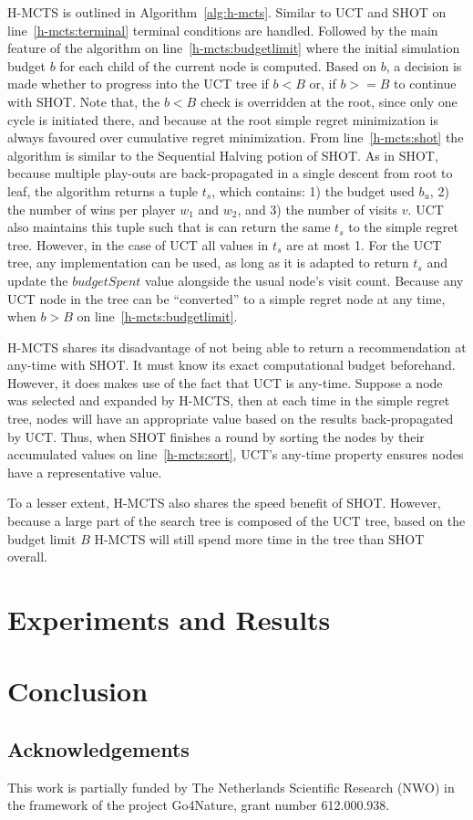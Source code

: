 \documentclass[a4paper]{llncs}
\begin{document}
H-MCTS is outlined in Algorithm~\ref{alg:h-mcts}. Similar to UCT and SHOT on line~\ref{h-mcts:terminal} terminal conditions are handled. Followed by the main feature of the algorithm on line~\ref{h-mcts:budgetlimit} where the initial simulation budget $b$ for each child of the current node is computed. Based on $b$, a decision is made whether to progress into the UCT tree if $b<B$ or, if $b >= B$ to continue with SHOT. Note that, the $b<B$ check is overridden at the root, since only one cycle is initiated there, and because at the root simple regret minimization is always favoured over cumulative regret minimization. From line~\ref{h-mcts:shot} the algorithm is similar to the Sequential Halving potion of SHOT. As in SHOT, because multiple play-outs are back-propagated in a single descent from root to leaf, the algorithm returns a tuple $t_s$, which contains: 1) the budget used $b_u$, 2) the number of wins per player $w_1$ and $w_2$, and 3) the number of visits $v$. UCT also maintains this tuple such that is can return the same $t_s$ to the simple regret tree. However, in the case of UCT all values in $t_s$ are at most 1. For the UCT tree, any implementation can be used, as long as it is adapted to return $t_s$ and update the $budgetSpent$ value alongside the usual node's visit count. Because any UCT node in the tree can be ``converted'' to a simple regret node at any time, when $b>B$ on line~\ref{h-mcts:budgetlimit}.

H-MCTS shares its disadvantage of not being able to return a recommendation at any-time with SHOT. It must know its exact computational budget beforehand. However, it does makes use of the fact that UCT is any-time. Suppose a node was selected and expanded by H-MCTS, then at each time in the simple regret tree, nodes will have an appropriate value based on the results back-propagated by UCT. Thus, when SHOT finishes a round by sorting the nodes by their accumulated values on line~\ref{h-mcts:sort}, UCT's any-time property ensures nodes have a representative value.

To a lesser extent, H-MCTS also shares the speed benefit of SHOT. However, because a large part of the search tree is composed of the UCT tree, based on the budget limit $B$ H-MCTS will still spend more time in the tree than SHOT overall.

\section{Experiments and Results}
\label{sec:exp_res}

\section{Conclusion}
\label{sec:concl}

\subsection*{Acknowledgements} 
This work is partially funded by The Netherlands Scientific Research (NWO) in the framework of the project Go4Nature, grant number 612.000.938.



\end{document}
